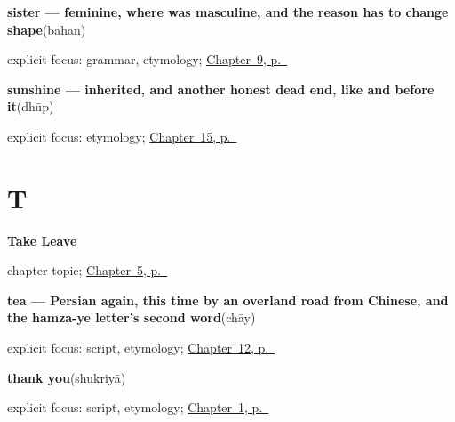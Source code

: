 \noindent\begin{minipage}[t]{\linewidth}
\raggedright
\textbf{sister — feminine, where  was masculine, and the reason  has to change shape}\enspace\emph{}\enspace(bahan)\par
\footnotesize explicit focus: grammar, etymology; \hyperref[ch:ur-people]{Chapter~9, p.~\pageref*{ch:ur-people}}
\end{minipage}\par\smallskip

\noindent\begin{minipage}[t]{\linewidth}
\raggedright
\textbf{sunshine — inherited, and another honest dead end, like  and  before it}\enspace\emph{}\enspace(dhūp)\par
\footnotesize explicit focus: etymology; \hyperref[ch:ur-weather]{Chapter~15, p.~\pageref*{ch:ur-weather}}
\end{minipage}\par\smallskip

\section*{T}

\noindent\begin{minipage}[t]{\linewidth}
\raggedright
\textbf{Take Leave}\par
\footnotesize chapter topic; \hyperref[ch:ur-take-leave]{Chapter~5, p.~\pageref*{ch:ur-take-leave}}
\end{minipage}\par\smallskip

\noindent\begin{minipage}[t]{\linewidth}
\raggedright
\textbf{tea — Persian again, this time by an overland road from Chinese, and the hamza-ye letter's second word}\enspace\emph{}\enspace(chāy)\par
\footnotesize explicit focus: script, etymology; \hyperref[ch:ur-food-words]{Chapter~12, p.~\pageref*{ch:ur-food-words}}
\end{minipage}\par\smallskip

\noindent\begin{minipage}[t]{\linewidth}
\raggedright
\textbf{thank you}\enspace\emph{}\enspace(shukriyā)\par
\footnotesize explicit focus: script, etymology; \hyperref[ch:urdu-greetings]{Chapter~1, p.~\pageref*{ch:urdu-greetings}}
\end{minipage}\par\smallskip

